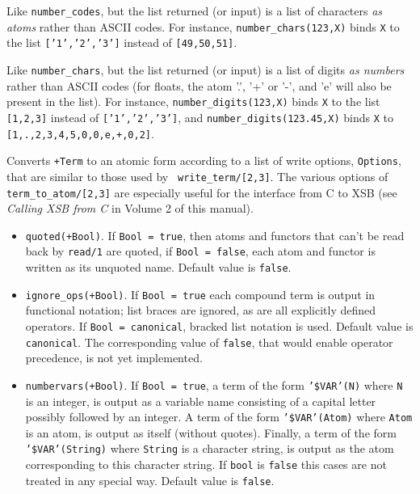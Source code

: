 \begin{description}
    Like \verb|number_codes|, but the list returned (or input) is a list of
    characters \emph{as atoms} rather than ASCII codes. For instance, 
    \verb|number_chars(123,X)| binds {\tt X} to the list {\tt ['1','2','3']}
    instead of {\tt [49,50,51]}.

    Like \verb|number_chars|, but the list returned (or input) is a list of
    digits \emph{as numbers} rather than ASCII codes (for floats, the atom
    '.', '+' or '-', and 'e' will also be present in the list). For instance, 
    \verb|number_digits(123,X)| binds {\tt X} to the list {\tt [1,2,3]}
    instead of {\tt ['1','2','3']}, and \verb|number_digits(123.45,X)|
    binds {\tt X} to {\tt [1,.,2,3,4,5,0,0,e,+,0,2]}.


%
Converts {\tt +Term} to an atomic form according to a list of write
options, {\tt Options}, that are similar to those used by {\tt
write\_term/[2,3]}.  The various options of {\tt
term\_to\_atom/[2,3]} are especially useful for the interface from C
to XSB (see {\em Calling XSB from C} in Volume 2 of this manual).
%
\begin{itemize}
%
\item {\tt quoted(+Bool)}.  If {\tt Bool = true}, then atoms and
    functors that can't be read back by {\tt read/1} are quoted, if
    {\tt Bool = false}, each atom and functor is written as its
    unquoted name. Default value is {\tt false}.
%
\item {\tt ignore\_ops(+Bool)}. If {\tt Bool = true} each compound term
is output in functional notation; list braces are ignored, as are all
explicitly defined operators.  If {\tt Bool = canonical}, bracked list
notation is used.  Default value is {\tt canonical}.  The
corresponding value of {\tt false}, that would enable operator
precedence, is not yet implemented.
%
 \item {\tt numbervars(+Bool)}.  If {\tt Bool = true}, a term of the
form {\tt '\$VAR'(N)} where {\tt N} is an integer, is output as a
variable name consisting of a capital letter possibly followed by an
integer.  A term of the form {\tt '\$VAR'(Atom)} where {\tt Atom} is an
atom, is output as itself (without quotes).  Finally, a term of the
form {\tt '\$VAR'(String)} where {\tt String} is a character string, is
output as the atom corresponding to this character string.  If
{\tt bool} is {\tt false} this cases are not treated in any special
way.  Default value is {\tt false}.
%
\end{itemize}


\end{description}
